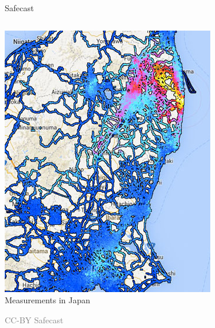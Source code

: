 \documentclass[presentation]{beamer}
\begin{document}
\begin{frame}[label=sec-7-7]{Safecast}
\begin{columns}
\begin{column}{0.4\textwidth}
\begin{varblock}[\textwidth]{}
\includegraphics[width=\textwidth]{images/safecast_japan_crop.jpg}\\
Measurements in Japan
\end{varblock}
\vspace{-0.3cm}
\tiny \textcolor{gray}{CC-BY Safecast}
\end{column}
\end{columns}
\end{frame}
\end{document}
